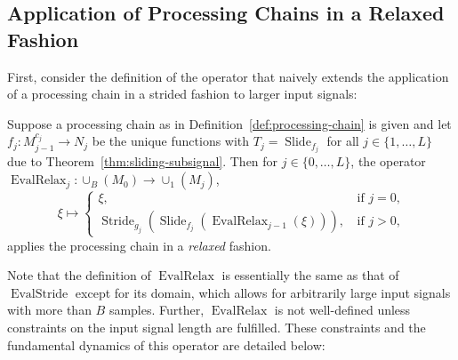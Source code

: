 \documentclass[journal]{IEEEtran}
\newcommand{\ROI}{B}
\newcommand{\discint}[2]{\{#1,\dotsc,#2\}}
\newcommand{\inint}[2]{\in\discint{#1}{#2}}
\DeclareMathOperator{\Slide}{Slide}
\DeclareMathOperator{\Stride}{Stride}
\DeclareMathOperator{\EvalStride}{EvalStride}
\DeclareMathOperator{\EvalRelax}{EvalRelax}
\begin{document}
\subsection{Application of Processing Chains in a Relaxed Fashion}
First, consider the definition of the operator that naively extends the application of a processing chain in a strided fashion to larger input signals:
\begin{definition}
\label{def:evalrelax}
Suppose a processing chain as in Definition~\ref{def:processing-chain} is given and let $f_j\colon M_{j - 1}^{c_j}\to N_j$ be the unique functions with $T_j = \Slide_{f_j}$ for all $j\inint{1}{L}$ due to Theorem~\ref{thm:sliding-subsignal}.
Then for $j\inint{0}{L}$, the operator $\EvalRelax_j\colon\cup_\ROI(M_0)\to\cup_1(M_j)$,
\begin{displaymath}
  \xi\mapsto
  \begin{cases}
    \xi\text{,} & \text{if } j = 0\text{,}\\
    \Stride_{g_j}(\Slide_{f_j}(\EvalRelax_{j - 1}(\xi)))\text{, } & \text{if } j > 0\text{,}
  \end{cases}
\end{displaymath}
applies the processing chain in a \emph{relaxed} fashion.
\end{definition}

Note that the definition of $\EvalRelax$ is essentially the same as that of $\EvalStride$ except for its domain, which allows for arbitrarily large input signals with more than $\ROI$ samples.
Further, $\EvalRelax$ is not well-defined unless constraints on the input signal length are fulfilled.
These constraints and the fundamental dynamics of this operator are detailed below:
\end{document}
